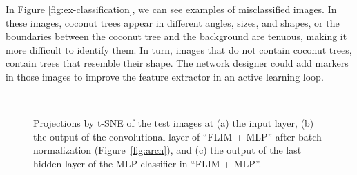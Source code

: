 \documentclass[journal, twoside]{IEEEtran}
\begin{document}
{ In Figure \ref{fig:ex-classification}, we can see examples of misclassified images. In these images, coconut trees appear in different angles, sizes, and shapes, or the boundaries between the coconut tree and the background are tenuous, making it more difficult to identify them. In turn, images that do not contain coconut trees, contain trees that resemble their shape. The network designer could add markers in those images to improve the feature extractor in an active learning loop.

\begin{figure}
  \centering
  ~
  ~
  \caption{Projections by t-SNE of the test images at (a) the input layer, (b) the output of the convolutional layer of  ``FLIM + MLP'' after batch normalization (Figure~\ref{fig:arch}), and (c) the output of the last hidden layer of the MLP classifier in  ``FLIM + MLP''.}
\end{figure}

}
\end{document}
